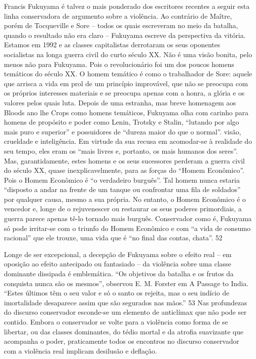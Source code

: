 Francis Fukuyama é talvez o mais ponderado dos escritores recentes a seguir esta linha conservadora de argumento sobre a violência. Ao contrário de Maître, porém de Tocqueville e Sore – todos os quais escreveram no meio da batalha, quando o resultado não era claro – Fukuyama escreve da perspectiva da vitória. Estamos em 1992 e as classes capitalistas derrotaram os seus oponentes socialistas na longa guerra civil do curto século XX. Não é uma visão bonita, pelo menos não para Fukuyama. Pois o revolucionário foi um dos poucos homens temáticos do século XX. O homem temático é como o trabalhador de Sore: aquele que arrisca a vida em prol de um princípio improvável, que não se preocupa com os próprios interesses materiais e se preocupa apenas com a honra, a glória e os valores pelos quais luta. Depois de uma estranha, mas breve homenagem aos Bloods ano lhe Crops como homens temáticos, Fukuyama olha com carinho para homens de propósito e poder como Lenin, Trotsky e Stalin, “lutando por algo mais puro e superior” e possuidores de “dureza maior do que o normal”.  visão, crueldade e inteligência. Em virtude da sua recusa em acomodar-se à realidade do seu tempo, eles eram os “mais livres e, portanto, os mais humanos dos seres”. Mas, garantidamente, estes homens e os seus sucessores perderam a guerra civil do século XX, quase inexplicavelmente, para as forças do “Homem Econômico”. Pois o Homem Econômico é “o verdadeiro burguês”. Tal homem nunca estaria “disposto a andar na frente de um tanque ou confrontar uma fila de soldados” por qualquer causa, mesmo a sua própria. No entanto, o Homem Econômico é o vencedor e, longe de o rejuvenescer ou restaurar os seus poderes primordiais, a guerra parece apenas tê-lo tornado mais burguês. Conservador como é, Fukuyama só pode irritar-se com o triunfo do Homem Econômico e com “a vida de consumo racional” que ele trouxe, uma vida que é “no final das contas, chata”.
 {\color{blue} 52}  

 
\par
 
Longe de ser excepcional, a decepção de Fukuyama sobre o efeito real – em oposição ao efeito antecipado ou fantasiado – da violência sobre uma classe dominante dissipada é emblemática. “Os objetivos da batalha e os frutos da conquista nunca são os mesmos”, observou E. M. Forster em A Passage to India. “Estes últimos têm o seu valor e só o santo os rejeita, mas o seu indício de imortalidade desaparece assim que são segurados nas mãos.”
 {\color{blue} 53}  
Nas profundezas do discurso conservador esconde-se um elemento de anticlímax que não pode ser contido. Embora o conservador se volte para a violência como forma de se libertar, ou das classes dominantes, do tédio mortal e da atrofia suavizante que acompanha o poder, praticamente todos os encontros no discurso conservador com a violência real implicam desilusão e deflação.
 
